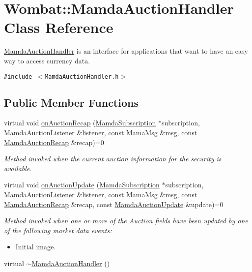 \hypertarget{classWombat_1_1MamdaAuctionHandler}{
\section{Wombat::Mamda\-Auction\-Handler Class Reference}
\label{classWombat_1_1MamdaAuctionHandler}
}
\hyperlink{classWombat_1_1MamdaAuctionHandler}{Mamda\-Auction\-Handler} is an interface for applications that want to have an easy way to access currency data.  


{\tt \#include $<$Mamda\-Auction\-Handler.h$>$}

\subsection*{Public Member Functions}
\begin{CompactItemize}
\item 
virtual void \hyperlink{classWombat_1_1MamdaAuctionHandler_2e59d05ab16c4fb329abff8b3381b5f9}{on\-Auction\-Recap} (\hyperlink{classWombat_1_1MamdaSubscription}{Mamda\-Subscription} $\ast$subscription, \hyperlink{classWombat_1_1MamdaAuctionListener}{Mamda\-Auction\-Listener} \&listener, const Mama\-Msg \&msg, const \hyperlink{classWombat_1_1MamdaAuctionRecap}{Mamda\-Auction\-Recap} \&recap)=0
\begin{CompactList}\small\item\em Method invoked when the current auction information for the security is available. \item\end{CompactList}\item 
virtual void \hyperlink{classWombat_1_1MamdaAuctionHandler_5e83ef0df411ddb008dc39cc4a876e54}{on\-Auction\-Update} (\hyperlink{classWombat_1_1MamdaSubscription}{Mamda\-Subscription} $\ast$subscription, \hyperlink{classWombat_1_1MamdaAuctionListener}{Mamda\-Auction\-Listener} \&listener, const Mama\-Msg \&msg, const \hyperlink{classWombat_1_1MamdaAuctionRecap}{Mamda\-Auction\-Recap} \&recap, const \hyperlink{classWombat_1_1MamdaAuctionUpdate}{Mamda\-Auction\-Update} \&update)=0
\begin{CompactList}\small\item\em Method invoked when one or more of the Auction fields have been updated by one of the following market data events:\begin{itemize}
\item Initial image. \end{itemize}
\item\end{CompactList}\item 
virtual \hyperlink{classWombat_1_1MamdaAuctionHandler_e293d223852deea28b9c41cfde5c7d3f}{$\sim$Mamda\-Auction\-Handler} ()
\end{CompactItemize}


